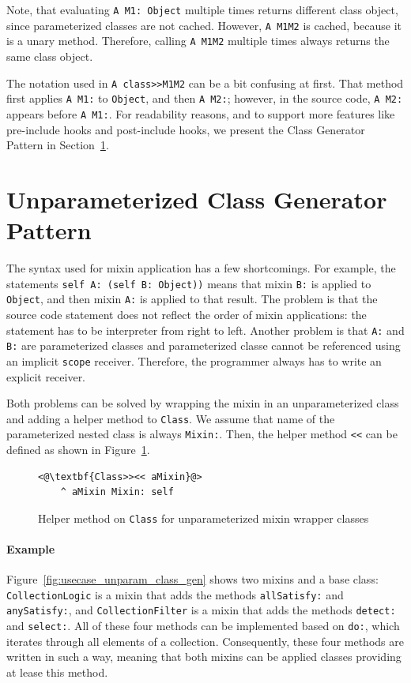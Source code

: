 Note, that evaluating \texttt{A M1: Object} multiple times returns different class object, since parameterized classes are not cached. However, \texttt{A M1M2} is cached, because it is a unary method. Therefore, calling \texttt{A M1M2} multiple times always returns the same class object.

The notation used in \texttt{A class>>M1M2} can be a bit confusing at first. That method first applies \texttt{A M1:} to \texttt{Object}, and then \texttt{A M2:}; however, in the source code, \texttt{A M2:} appears before \texttt{A M1:}. For readability reasons, and to support more features like pre-include hooks and post-include hooks, we present the Class Generator Pattern in Section~\ref{sec:usecase_classgen}.

\section{Unparameterized Class Generator Pattern}
\label{sec:usecase_classgen}
The syntax used for mixin application has a few shortcomings. For example, the statements \texttt{self A: (self B: Object))} means that mixin \texttt{B:} is applied to \texttt{Object}, and then mixin \texttt{A:} is applied to that result. The problem is that the source code statement does not reflect the order of mixin applications: the statement has to be interpreter from right to left. Another problem is that \texttt{A:} and \texttt{B:} are parameterized classes and parameterized classe cannot be referenced using an implicit \texttt{scope} receiver. Therefore, the programmer always has to write an explicit receiver.

Both problems can be solved by wrapping the mixin in an unparameterized class and adding a helper method to \texttt{Class}. We assume that name of the parameterized nested class is always \texttt{Mixin:}. Then, the helper method \texttt{<<} can be defined as shown in Figure~\ref{fig:usecase_class_lele}.

\begin{figure}[!htp]
\begin{lstlisting}
<@\textbf{Class>><< aMixin}@>
    ^ aMixin Mixin: self
\end{lstlisting}
\caption{Helper method on \texttt{Class} for unparameterized mixin wrapper classes}
\label{fig:usecase_class_lele}
\end{figure}

\paragraph{Example}
Figure~\ref{fig:usecase_unparam_class_gen} shows two mixins and a base class: \texttt{CollectionLogic} is a mixin that adds the methods \texttt{allSatisfy:} and \texttt{anySatisfy:}, and \texttt{CollectionFilter} is a mixin that adds the methods \texttt{detect:} and \texttt{select:}. All of these four methods can be implemented based on \texttt{do:}, which iterates through all elements of a collection. Consequently, these four methods are written in such a way, meaning that both mixins can be applied classes providing at lease this method.

